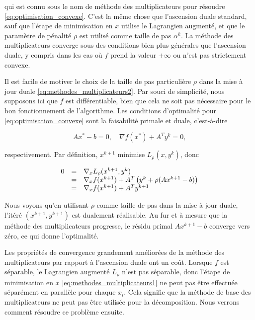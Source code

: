 qui est connu sous le nom de méthode des multiplicateurs pour résoudre \eqref{eq:optimisation_convexe}. C'est la même chose que l'ascension duale standard, sauf que l'étape de minimisation en \( x \) utilise le Lagrangien augmenté, et que le paramètre de pénalité \( \rho \) est utilisé comme taille de pas \( \alpha^k \). La méthode des multiplicateurs converge sous des conditions bien plus générales que l'ascension duale, y compris dans les cas où \( f \) prend la valeur \( +\infty \) ou n'est pas strictement convexe.

Il est facile de motiver le choix de la taille de pas particulière \( \rho \) dans la mise à jour duale \eqref{eq:methodes_multiplicateurs2}. Par souci de simplicité, nous supposons ici que \( f \) est différentiable, bien que cela ne soit pas nécessaire pour le bon fonctionnement de l'algorithme. Les conditions d'optimalité pour \eqref{eq:optimisation_convexe} sont la faisabilité primale et duale, c'est-à-dire

\begin{equation}Ax^* - b = 0, \quad \nabla f(x^*) + A^T y^k = 0,\end{equation}

respectivement. Par définition, \( x^{k+1} \) minimise \( L_\rho(x, y^k) \), donc

\begin{equation}
    \begin{array}{l l l}
        0 &=& \nabla_x L_\rho(x^{k+1}, y^k)\\
        &=& \nabla_x f(x^{k+1}) + A^T \left( y^k + \rho (Ax^{k+1} - b) \right)\\
        &=& \nabla_x f(x^{k+1}) + A^T y^{k+1}
    \end{array}
\end{equation}

Nous voyons qu'en utilisant \( \rho \) comme taille de pas dans la mise à jour duale, l'itéré \((x^{k+1}, y^{k+1})\) est dualement réalisable. Au fur et à mesure que la méthode des multiplicateurs progresse, le résidu primal \( Ax^{k+1} - b \) converge vers zéro, ce qui donne l'optimalité.

Les propriétés de convergence grandement améliorées de la méthode des multiplicateurs par rapport à l'ascension duale ont un coût. Lorsque \( f \) est séparable, le Lagrangien augmenté \( L_\rho \) n'est pas séparable, donc l'étape de minimisation en \( x \) \eqref{eq:methodes_multiplicateurs1} ne peut pas être effectuée séparément en parallèle pour chaque \( x_i \). Cela signifie que la méthode de base des multiplicateurs ne peut pas être utilisée pour la décomposition. Nous verrons comment résoudre ce problème ensuite.

